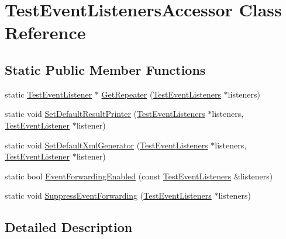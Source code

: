 \hypertarget{classtesting_1_1internal_1_1TestEventListenersAccessor}{\section{\-Test\-Event\-Listeners\-Accessor \-Class \-Reference}
\label{d8/d01/classtesting_1_1internal_1_1TestEventListenersAccessor}
}
\subsection*{\-Static \-Public \-Member \-Functions}
\begin{DoxyCompactItemize}
\item 
static \hyperlink{classtesting_1_1TestEventListener}{\-Test\-Event\-Listener} $\ast$ \hyperlink{classtesting_1_1internal_1_1TestEventListenersAccessor_a10226b457b5713fd15cd1f6b16d53e16}{\-Get\-Repeater} (\hyperlink{classtesting_1_1TestEventListeners}{\-Test\-Event\-Listeners} $\ast$listeners)
\item 
static void \hyperlink{classtesting_1_1internal_1_1TestEventListenersAccessor_a5564329b693a831a188062139fffb4aa}{\-Set\-Default\-Result\-Printer} (\hyperlink{classtesting_1_1TestEventListeners}{\-Test\-Event\-Listeners} $\ast$listeners, \hyperlink{classtesting_1_1TestEventListener}{\-Test\-Event\-Listener} $\ast$listener)
\item 
static void \hyperlink{classtesting_1_1internal_1_1TestEventListenersAccessor_a003f64b346a313ae93e320f66768f68f}{\-Set\-Default\-Xml\-Generator} (\hyperlink{classtesting_1_1TestEventListeners}{\-Test\-Event\-Listeners} $\ast$listeners, \hyperlink{classtesting_1_1TestEventListener}{\-Test\-Event\-Listener} $\ast$listener)
\item 
static bool \hyperlink{classtesting_1_1internal_1_1TestEventListenersAccessor_a56e024fd5b04f8e49bb9404284925fed}{\-Event\-Forwarding\-Enabled} (const \hyperlink{classtesting_1_1TestEventListeners}{\-Test\-Event\-Listeners} \&listeners)
\item 
static void \hyperlink{classtesting_1_1internal_1_1TestEventListenersAccessor_a80636797082f6d8961204df473cf3687}{\-Suppress\-Event\-Forwarding} (\hyperlink{classtesting_1_1TestEventListeners}{\-Test\-Event\-Listeners} $\ast$listeners)
\end{DoxyCompactItemize}


\subsection{\-Detailed \-Description}


